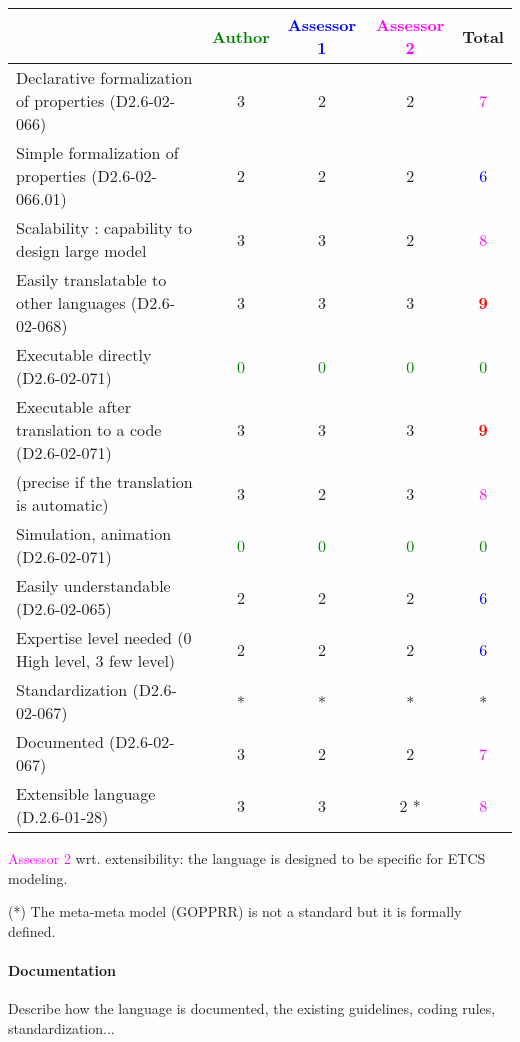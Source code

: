 \begin{tabular}{|l | c | c | c | c|}
  \hline
  & \textcolor{green}{Author} & \textcolor{blue}{Assessor 1} & \textcolor{magenta}{Assessor 2} & Total \\
  \hline
  Declarative formalization of properties (D2.6-02-066) &3 &2 & 2   & \textcolor{magenta}{7} \\
  \hline
  Simple formalization of properties (D2.6-02-066.01) &2 &2 & 2   & \textcolor{blue}{6} \\
  \hline
  Scalability : capability to design large model &3 &3 & 2   & \textcolor{magenta}{8} \\
  \hline
  Easily translatable to other languages (D2.6-02-068) &3 &3 & 3   & \textcolor{red}{\textbf{9}} \\
  \hline
  Executable directly (D2.6-02-071) & \textcolor{green}{0}   & \textcolor{green}{0}   & \textcolor{green}{0} & \textcolor{green}{0} \\
  \hline
  Executable after translation to a code (D2.6-02-071) &3 &3 & 3   & \textcolor{red}{\textbf{9}} \\
  (precise if the translation is automatic) &3 &2 & 3   & \textcolor{magenta}{8} \\
  \hline
  Simulation, animation (D2.6-02-071) & \textcolor{green}{0}   & \textcolor{green}{0}   & \textcolor{green}{0} & \textcolor{green}{0} \\
  \hline
  Easily understandable (D2.6-02-065) &2 &2 & 2   & \textcolor{blue}{6} \\
  \hline
  Expertise level needed (0 High level, 3 few level) &2 &2 & 2   & \textcolor{blue}{6} \\
  \hline
  Standardization (D2.6-02-067) &* &* & *& * \\
  \hline
  Documented (D2.6-02-067) &3 &2 & 2   & \textcolor{magenta}{7} \\
  \hline
  Extensible language (D.2.6-01-28) &3 &3 & 2   *& \textcolor{magenta}{8} \\
  \hline
\end{tabular}

\textcolor{magenta}{Assessor 2} wrt. extensibility: the language is designed to
be specific for ETCS modeling.

\begin{author_comment}
(*) The meta-meta model (GOPPRR) is not a standard but it is formally defined.
\end{author_comment}

\paragraph{Documentation} Describe how the language is documented, the existing guidelines, coding rules, standardization...

